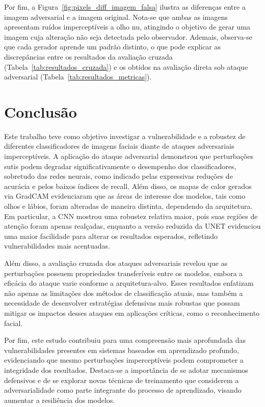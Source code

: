 \documentclass[12pt]{article}
\begin{document}
Por fim, a Figura~\ref{fig:pixels_diff_imagem_falsa} ilustra as diferenças
entre a imagem adversarial e a imagem original. Nota-se que ambas as imagens
apresentam ruídos imperceptíveis a olho nu, atingindo o objetivo de gerar uma
imagem cuja alteração não seja detectada pelo observador. Ademais, observa-se
que cada gerador aprende um padrão distinto, o que pode explicar as
discrepâncias entre os resultados da avaliação cruzada
(Tabela~\ref{tab:resultados_cruzada}) e os obtidos na avaliação direta sob
ataque adversarial (Tabela~\ref{tab:resultados_metricas}).

\section{Conclusão}

Este trabalho teve como objetivo investigar a vulnerabilidade e a robustez de
diferentes classificadores de imagens faciais diante de ataques adversariais
imperceptíveis. A aplicação do ataque adversarial demonstrou que perturbações
sutis podem degradar significativamente o desempenho dos classificadores,
sobretudo das redes neurais, como indicado pelas expressivas reduções de
acurácia e pelos baixos índices de recall. Além disso, os mapas de calor
gerados via GradCAM evidenciaram que as áreas de interesse dos modelos, tais
como olhos e lábios, foram alteradas de maneira distinta, dependendo da
arquitetura. Em particular, a CNN mostrou uma robustez relativa maior, pois
suas regiões de atenção foram apenas realçadas, enquanto a versão reduzida da
UNET evidenciou uma maior facilidade para alterar os resultados esperados,
refletindo vulnerabilidades mais acentuadas.

Além disso, a avaliação cruzada dos ataques adversariais revelou que as
perturbações possuem propriedades transferíveis entre os modelos, embora a
eficácia do ataque varie conforme a arquitetura-alvo. Esses resultados
enfatizam não apenas as limitações dos métodos de classificação atuais, mas
também a necessidade de desenvolver estratégias defensivas mais robustas que
possam mitigar os impactos desses ataques em aplicações críticas, como o
reconhecimento facial.

Por fim, este estudo contribuiu para uma compreensão mais aprofundada das
vulnerabilidades presentes em sistemas baseados em aprendizado profundo,
evidenciando que mesmo perturbações imperceptíveis podem comprometer a
integridade dos resultados. Destaca-se a importância de se adotar mecanismos
defensivos e de se explorar novas técnicas de treinamento que considerem a
adversarialidade como parte integrante do processo de aprendizado, visando
aumentar a resiliência dos modelos.



\nocite{*}
\end{document}
